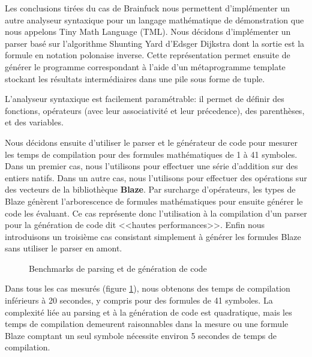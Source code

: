 \documentclass[main]{subfiles}
\begin{document}
Les conclusions tir\'ees du cas de Brainfuck nous permettent d'impl\'ementer
un autre analyseur syntaxique pour un langage math\'ematique de d\'emonstration
que nous appelons Tiny Math Language (TML).
Nous d\'ecidons d'impl\'ementer un parser bas\'e sur
l'algorithme Shunting Yard d'Edsger Dijkstra dont la sortie est la formule
en notation polonaise inverse. Cette repr\'esentation permet ensuite de
g\'en\'erer le programme correspondant \`a l'aide d'un m\'etaprogramme template
stockant les r\'esultats interm\'ediaires dans une pile sous forme de tuple.

L'analyseur syntaxique est facilement param\'etrable: il permet de d\'efinir des
fonctions, op\'erateurs (avec leur associativit\'e et leur pr\'ecedence),
des parenth\`eses, et des variables.

Nous d\'ecidons ensuite d'utiliser le parser et le g\'en\'erateur de code
pour mesurer les temps de compilation pour des formules math\'ematiques
de 1 \`a 41 symboles. Dans un premier cas, nous l'utilisons pour effectuer une
s\'erie d'addition sur des entiers natifs.
Dans un autre cas, nous l'utilisons pour effectuer des op\'erations sur des
vecteurs de la biblioth\`eque \textbf{Blaze}. Par surcharge d'op\'erateurs,
les types de Blaze g\'en\`erent l'arborescence de formules math\'ematiques
pour ensuite g\'en\'erer le code les \'evaluant. Ce cas repr\'esente donc
l'utilisation \`a la compilation d'un parser pour la g\'en\'eration de code dit
<<hautes performances>>.
Enfin nous introduisons un troisi\`eme cas consistant simplement \`a
g\'en\'erer les formules Blaze sans utiliser le parser en amont.

\begin{figure}[h]

\caption{Benchmarks de parsing et de g\'en\'eration de code}
\label{fig:tml-ctbench-fr}
\end{figure}

Dans tous les cas mesur\'es (figure \ref{fig:tml-ctbench-fr}), nous obtenons
des temps de compilation inf\'erieurs \`a 20 secondes, y compris pour des
formules de 41 symboles.
La complexit\'e  li\'ee au parsing et \`a la g\'en\'eration de code
est quadratique, mais les temps de compilation demeurent raisonnables
dans la mesure ou une formule Blaze comptant un seul symbole n\'ecessite
environ 5 secondes de temps de compilation.
\end{document}
